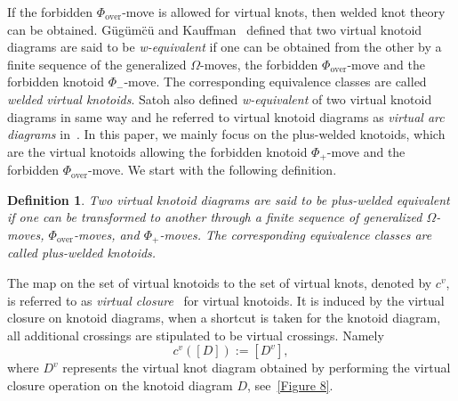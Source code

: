 \documentclass[11pt]{amsart}
\theoremstyle{noparens}
\newtheorem{definition}{Definition}[section]
\numberwithin{equation}{section}
\numberwithin{equation}{section}
\begin{document}
If the forbidden $\Phi_{\text{over}}$-move is allowed for virtual knots, then welded knot theory~\citep{rourke2007welded} can be obtained. G{\"u}g{\"u}m{\"c}{\"u} and Kauffman~\citep{gugumcu2017new} defined that two virtual knotoid diagrams are said to be \textit{w-equivalent} if one can be obtained from the other by a finite sequence of the generalized $\Omega$-moves, the forbidden $\Phi_{\text{over}}$-move and the forbidden knotoid $\Phi_-$-move. The corresponding equivalence classes are called \textit{welded virtual knotoids}. Satoh also defined \textit{w-equivalent} of two virtual knotoid diagrams in same way and he referred to virtual knotoid diagrams  as \textit{virtual arc diagrams} in~\citep{Satoh2000}. 
In this paper, we mainly focus on the plus-welded knotoids, which are the virtual knotoids allowing the forbidden knotoid $\Phi_+$-move and the forbidden $\Phi_{\text{over}}$-move. We start with the following definition.

\begin{definition} \label{Definition 2.1}
\rm{Two virtual knotoid diagrams are said to be \textit{plus-welded equivalent} if one can be transformed to another  through a finite sequence of generalized $\Omega$-moves, $\Phi_{\text{over}}$-moves, and $\Phi_+$-moves.  The corresponding equivalence classes are called \textit{plus-welded knotoids}. }
\end{definition}

The map on the set of virtual knotoids to the set of virtual knots, denoted by $c^{v}$, is referred to as \textit{virtual closure}~\citep{MANOURAS2021103402} for virtual knotoids. It is induced by the virtual closure on knotoid diagrams, when a shortcut is taken for the knotoid diagram, all additional crossings are stipulated to be virtual crossings. Namely 
$$
c^{v}([D]):=\left[D^{v}\right],
$$ 
where $D^{v}$ represents the virtual knot diagram obtained by performing the virtual closure operation on the knotoid diagram $D$, see~\cref{Figure 8}.

\vspace{-8.mm}
\end{document}
